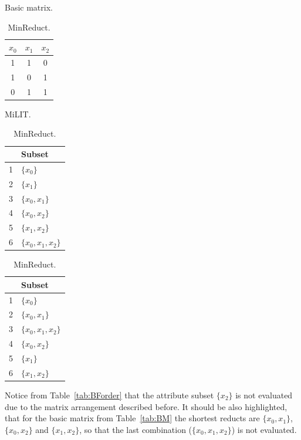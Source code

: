 \documentclass[citenumber]{llncs}
\begin{document}
	\begin{table}[htb]
		\begin{minipage}[t]{.3\linewidth}
			\small
			\caption{Basic matrix.}
			\centering
			\begin{tabular}{ccc}\label{tab:BM}
				$x_0$ & $x_1$ & $x_2$\\
				\hline
				1 & 1 & 0 \\
				1 & 0 & 1 \\
				0 & 1 & 1 \\
				
			\end{tabular}     
		\end{minipage}%
		\begin{minipage}[t]{.3\linewidth}
			\small
			\caption{MiLIT.}
			\centering
			\begin{tabular}{ll}\label{tab:BForder}
				 & Subset\\
				\hline
				1 & $\{x_0\}$ \\
				2 & $\{x_1\}$ \\
				3 & $\{x_0,x_1\}$ \\
				4 & $\{x_0,x_2\}$ \\
				5 & $\{x_1,x_2\}$ \\
				6 & $\{x_0,x_1,x_2\}$ \\
			\end{tabular}     
		\end{minipage}%
		\begin{minipage}[t]{.3\linewidth}   
			\small
			\caption{MinReduct.}
			\centering
			\begin{tabular}{ll}\label{tab:LGForder}
				 & Subset\\
				\hline
				1 & $\{x_0\}$ \\
				2 & $\{x_0,x_1\}$ \\ 
				3 & $\{x_0,x_1,x_2\}$ \\
				4 & $\{x_0,x_2\}$ \\
				5 & $\{x_1\}$ \\
				6 & $\{x_1,x_2\}$ \\
			\end{tabular}  
		\end{minipage}%
	\end{table}  

	Notice from Table~\ref{tab:BForder} that the attribute subset $\{x_2\}$	is not evaluated due to the matrix arrangement described before. It should be also highlighted, that for the basic matrix from Table~\ref{tab:BM} the shortest reducts are $\{x_0,x_1\}$, $\{x_0,x_2\}$ and $\{x_1,x_2\}$, so that the last combination ($\{x_0,x_1,x_2\}$) is not evaluated.
	
\end{document}
